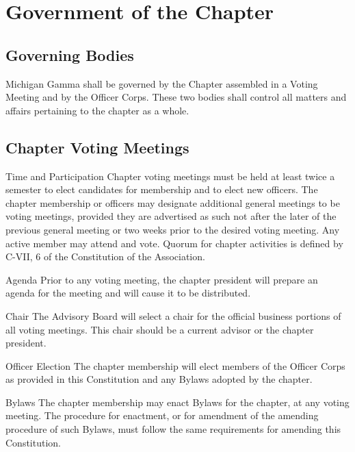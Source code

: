 \chapter{Government of the Chapter}

\section{Governing Bodies}
Michigan Gamma shall be governed by the Chapter assembled in a Voting Meeting and by the Officer Corps.
These two bodies shall control all matters and affairs pertaining to the chapter as a whole.

\section{Chapter Voting Meetings}
\begin{enumsubsection}
\item{Time and Participation}
Chapter voting meetings must be held at least twice a semester to elect candidates for membership and to elect new officers.
The chapter membership or officers may designate additional general meetings to be voting meetings, provided they are advertised as such not after the later of the previous general meeting or two weeks prior to the desired voting meeting.
Any active member may attend and vote.
Quorum for chapter activities is defined by C-VII, 6 of the Constitution of the Association.

\item{Agenda}
Prior to any voting meeting, the chapter president will prepare an agenda for the meeting and will cause it to be distributed.

\item{Chair}
The Advisory Board will select a chair for the official business portions of all voting meetings.
This chair should be a current advisor or the chapter president.

\item{Officer Election}
The chapter membership will elect members of the Officer Corps as provided in this Constitution and any Bylaws adopted by the chapter.

\item{Bylaws}
The chapter membership may enact Bylaws for the chapter, at any voting meeting.
The procedure for enactment, or for amendment of the amending procedure of such Bylaws, must follow the same requirements for amending this Constitution.

\end{enumsubsection}
